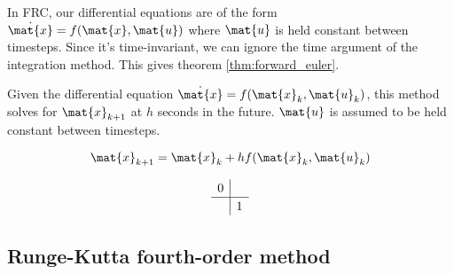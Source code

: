 In FRC, our differential equations are of the form
$\dot{\mat{x}} = f(\mat{x}, \mat{u})$ where $\mat{u}$ is held constant between
timesteps. Since it's time-invariant, we can ignore the time argument of the
integration method. This gives theorem \ref{thm:forward_euler}.
\begin{theorem}
  \label{thm:forward_euler}

  Given the differential equation $\dot{\mat{x}} = f(\mat{x}_k, \mat{u}_k)$,
  this method solves for $\mat{x}_{k+1}$ at $h$ seconds in the future.
  $\mat{u}$ is assumed to be held constant between timesteps.
  \begin{center}
    \begin{minipage}{0.35\linewidth}
      \centering
      \begin{equation*}
        \mat{x}_{k+1} = \mat{x}_k + h f(\mat{x}_k, \mat{u}_k)
      \end{equation*}
    \end{minipage}
    \quad
    \begin{minipage}{0.35\linewidth}
      \centering
      \begin{equation*}
        \renewcommand\arraystretch{1.2}
        \begin{array}{c|c}
          0 \\
          \hline
          & 1
        \end{array}
      \end{equation*}
    \end{minipage}
  \end{center}
\end{theorem}

\subsection{Runge-Kutta fourth-order method}

